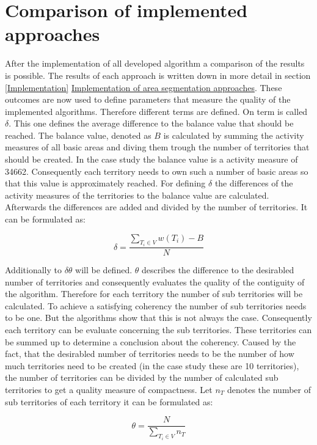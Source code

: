\section{Comparison of implemented approaches}\label{comparisonapproaches}
After the implementation of all developed algorithm a comparison of the results is possible. The results of each approach is written down in more detail in section \ref{Implementation} \hyperref[Implementation]{Implementation of area segmentation approaches}. These outcomes are now used to define parameters that measure the quality of the implemented algorithms. Therefore different terms are defined.
On term is called $\delta$. This one defines the average difference to the balance value that should be reached. The balance value, denoted as $B$ is calculated by summing the activity measures of all basic areas and diving them trough the number of territories that should be created. In the case study the balance value is a activity measure of 34662. Consequently each territory needs to own such a number of basic areas so that this value is approximately reached. For defining $\delta$ the differences of the activity measures of the territories to the balance value are calculated. Afterwards the differences are added and divided by the number of territories. It can be formulated as:

\[ \mathit{\delta  = \frac{\sum\nolimits  _{T_{i} \in V} w(T_{i})-B}{N}}\]

Additionally to $\delta \theta $ will be defined. $\theta$ describes the difference to the desirabled number of territories and consequently evaluates the quality of the contiguity of the algorithm. Therefore for each territory the number of sub territories will be calculated. To achieve a satisfying coherency the number of sub territories needs to be one. But the algorithms show that this is not always the case. Consequently each territory can be evaluate concerning the sub territories. These territories can be summed up to determine a conclusion about the coherency. Caused by the fact, that the desirabled number of territories needs to be the number of how much territories need to be created (in the case study these are 10 territories), the number of territories can be divided by the number of calculated sub territories to get a quality measure of compactness. Let $n_{T}$ denotes the number of sub territories of each territory it can be formulated as:

\[ \mathit{\theta  = \frac{N}{\sum\nolimits  _{T_{i} \in V} n_{T}}}\]

